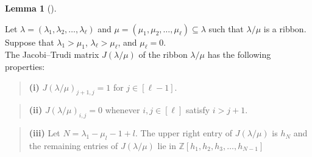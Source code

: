 \documentclass[numbers=enddot,12pt,final,onecolumn,notitlepage]{scrartcl}%
\theoremstyle{definition}
\newtheorem{lem}[theo]{Lemma}
\newenvironment{lemma}[1][]
{\begin{lem}[#1]\begin{leftbar}}
{\end{leftbar}\end{lem}}
\newtheorem{defi}[theo]{Definition}
\newenvironment{definition}[1][]
{\begin{defi}[#1]\begin{leftbar}}
{\end{leftbar}\end{defi}}
\newtheorem{exam}[theo]{Example}
\newenvironment{example}[1][]
{\begin{exam}[#1]\begin{leftbar}}
{\end{leftbar}\end{exam}}
\newenvironment{statement}{\begin{quote}}{\end{quote}}
\renewcommand{\leq}{\leqslant}
\theoremstyle{plainsl}
\begin{document}











\begin{lemma}
\label{lemma.Hessenberg}




















Let $\lambda= (\lambda_1, \lambda_2, \ldots, \lambda_{\ell})$  and $\mu= (\mu_1, \mu_2, \ldots, \mu_{\ell}) \subseteq \lambda$ such that $\lambda/\mu$ is a ribbon. 
Suppose that $\lambda_1> \mu_1$, $\lambda_\ell> \mu_\ell$, and $\mu_{\ell}=0$.\\
 
The Jacobi--Trudi matrix $J(\lambda/\mu)$ of the ribbon $\lambda/\mu$ has the following properties:

\begin{statement}
\textbf{(i)} $J(\lambda/\mu)_{j+1,j}=1$ for $j \in [\ell-1]$.
\end{statement}
 
\begin{statement}
\textbf{(ii)} $J(\lambda/\mu)_{i,j}=0$ whenever
$i, j \in [\ell]$ satisfy $i > j+1$.
\end{statement}

\begin{statement}
\textbf{(iii)} Let $N= \lambda_1 -\mu_l-1+l$. The upper right entry of $J(\lambda/\mu)$ is $h_N$ and the remaining entries of $J(\lambda/\mu)$ lie in $\mathbb{Z}\left[  h_{1},h_{2}%
,h_{3},\ldots, h_{N-1}\right]$
\end{statement}
\end{lemma}
\end{document}
